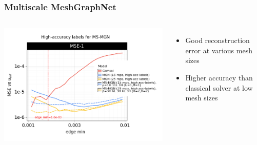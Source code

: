 \documentclass{beamer}
\begin{document}
\begin{frame}
    \frametitle{Multiscale MeshGraphNet}
\begin{columns}
\includegraphics[scale=0.2]{figures/MGN_error.png}
\begin{itemize}
    \item Good reconstruction error at various mesh sizes
    \item Higher accuracy than classical solver at low mesh sizes
\end{itemize}
\end{columns}
\end{frame}
\end{document}
